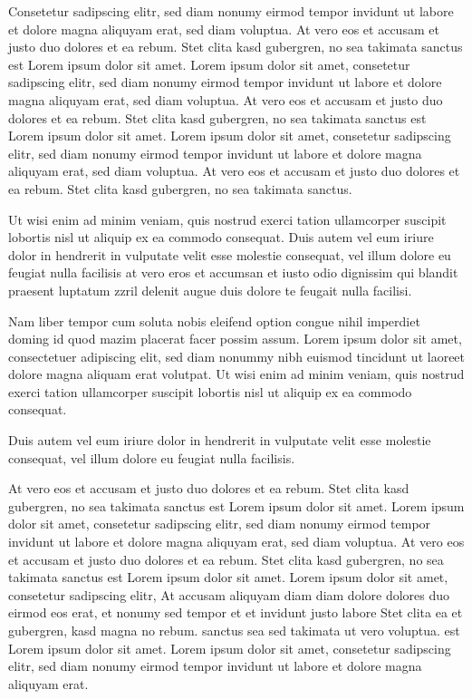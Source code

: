 Consetetur sadipscing elitr, sed diam nonumy eirmod tempor invidunt ut labore et
dolore magna aliquyam erat, sed diam voluptua. At vero eos et accusam et justo
duo dolores et ea rebum. Stet clita kasd gubergren, no sea takimata sanctus est
Lorem ipsum dolor sit amet. Lorem ipsum dolor sit amet, consetetur sadipscing
elitr, sed diam nonumy eirmod tempor invidunt ut labore et dolore magna aliquyam
erat, sed diam voluptua. At vero eos et accusam et justo duo dolores et ea
rebum. Stet clita kasd gubergren, no sea takimata sanctus est Lorem ipsum dolor
sit amet. Lorem ipsum dolor sit amet, consetetur sadipscing elitr, sed diam
nonumy eirmod tempor invidunt ut labore et dolore magna aliquyam erat, sed diam
voluptua. At vero eos et accusam et justo duo dolores et ea rebum. Stet clita
kasd gubergren, no sea takimata sanctus.
 
Ut wisi enim ad minim veniam, quis nostrud exerci tation ullamcorper suscipit
lobortis nisl ut aliquip ex ea commodo consequat. Duis autem vel eum iriure
dolor in hendrerit in vulputate velit esse molestie consequat, vel illum dolore
eu feugiat nulla facilisis at vero eros et accumsan et iusto odio dignissim qui
blandit praesent luptatum zzril delenit augue duis dolore te feugait nulla
facilisi.

Nam liber tempor cum soluta nobis eleifend option congue nihil imperdiet doming
id quod mazim placerat facer possim assum. Lorem ipsum dolor sit amet,
consectetuer adipiscing elit, sed diam nonummy nibh euismod tincidunt ut laoreet
dolore magna aliquam erat volutpat. Ut wisi enim ad minim veniam, quis nostrud
exerci tation ullamcorper suscipit lobortis nisl ut aliquip ex ea commodo
consequat.

Duis autem vel eum iriure dolor in hendrerit in vulputate velit esse molestie
consequat, vel illum dolore eu feugiat nulla facilisis.

At vero eos et accusam et justo duo dolores et ea rebum. Stet clita kasd
gubergren, no sea takimata sanctus est Lorem ipsum dolor sit amet. Lorem ipsum
dolor sit amet, consetetur sadipscing elitr, sed diam nonumy eirmod tempor
invidunt ut labore et dolore magna aliquyam erat, sed diam voluptua. At vero eos
et accusam et justo duo dolores et ea rebum. Stet clita kasd gubergren, no sea
takimata sanctus est Lorem ipsum dolor sit amet. Lorem ipsum dolor sit amet,
consetetur sadipscing elitr, At accusam aliquyam diam diam dolore dolores duo
eirmod eos erat, et nonumy sed tempor et et invidunt justo labore Stet clita ea
et gubergren, kasd magna no rebum. sanctus sea sed takimata ut vero voluptua.
est Lorem ipsum dolor sit amet. Lorem ipsum dolor sit amet, consetetur
sadipscing elitr, sed diam nonumy eirmod tempor invidunt ut labore et dolore
magna aliquyam erat.

